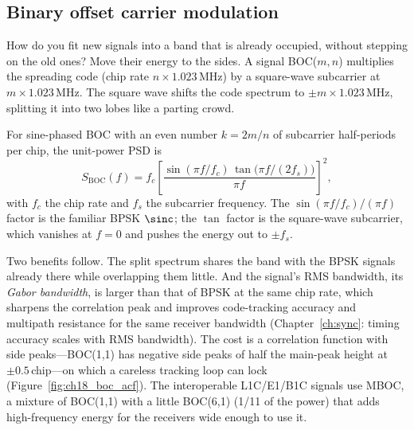 
\subsection{Binary offset carrier modulation}

How do you fit new signals into a band that is already occupied, without stepping on the old
ones? Move their energy to the sides. A  signal BOC($m,n$) multiplies
the spreading code (chip rate $n\times1.023$\,MHz) by a square-wave subcarrier at
$m\times1.023$\,MHz. The square wave shifts the code spectrum to $\pm m\times1.023$\,MHz, splitting
it into two lobes like a parting crowd.

\begin{deeper}
For sine-phased BOC with an even number $k=2m/n$ of subcarrier half-periods per chip, the
unit-power PSD is
\begin{equation}
S_{\text{BOC}}(f)=f_c\left[\frac{\sin(\pi f/f_c)\,\tan\!\big(\pi f/(2f_s)\big)}{\pi f}\right]^2,
\end{equation}
with $f_c$ the chip rate and $f_s$ the subcarrier frequency. The $\sin(\pi f/f_c)/(\pi f)$ factor
is the familiar BPSK $\sinc$; the $\tan$ factor is the square-wave subcarrier, which vanishes at
$f=0$ and pushes the energy out to $\pm f_s$.
\end{deeper}


Two benefits follow. The split spectrum shares the band with the BPSK signals already there while
overlapping them little. And the signal's RMS bandwidth, its \emph{Gabor bandwidth}, is larger than
that of BPSK at the same chip rate, which sharpens the correlation peak and improves code-tracking
accuracy and multipath resistance for the same receiver bandwidth (Chapter~\ref{ch:sync}: timing
accuracy scales with RMS bandwidth). The cost is a correlation function with side
peaks---BOC(1,1) has negative side peaks of half the main-peak height at $\pm0.5$\,chip---on which
a careless tracking loop can lock (Figure~\ref{fig:ch18_boc_acf}). The interoperable L1C/E1/B1C signals use MBOC, a mixture of
BOC(1,1) with a little BOC(6,1) (1/11 of the power) that adds high-frequency energy for the
receivers wide enough to use it.

